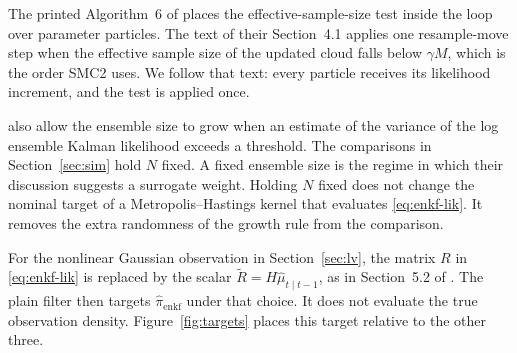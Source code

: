 The printed Algorithm~6 of \citet{golightly2026} places the effective-sample-size test inside the loop over parameter particles. The text of their Section~4.1 applies one resample-move step when the effective sample size of the updated cloud falls below \(\gamma M\), which is the order SMC2 uses. We follow that text: every particle receives its likelihood increment, and the test is applied once.

\citet[Section~4.1]{golightly2026} also allow the ensemble size to grow when an estimate of the variance of the log ensemble Kalman likelihood exceeds a threshold. The comparisons in Section~\ref{sec:sim} hold \(N\) fixed. A fixed ensemble size is the regime in which their discussion suggests a surrogate weight. Holding \(N\) fixed does not change the nominal target of a Metropolis--Hastings kernel that evaluates \eqref{eq:enkf-lik}. It removes the extra randomness of the growth rule from the comparison.

For the nonlinear Gaussian observation in Section~\ref{sec:lv}, the matrix \(R\) in \eqref{eq:enkf-lik} is replaced by the scalar \(\tilde{R} = H\hat{\mu}_{t\mid t-1}\), as in Section~5.2 of \citet{golightly2026}. The plain filter then targets \(\hat{\pi}_{\mathrm{enkf}}\) under that choice. It does not evaluate the true observation density. Figure~\ref{fig:targets} places this target relative to the other three.

